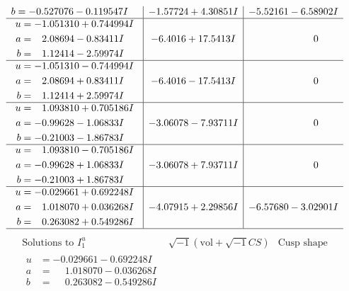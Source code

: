 \documentclass[1p]{elsarticle_modified}
\theoremstyle{definition}
\newcommand{\I}{\sqrt{-1}}
\begin{document}
$$\begin{array}{c|c|c}
\begin{aligned}
b &= -0.527076 - 0.119547 I\end{aligned}
 & -1.57724 + 4.30851 I & -5.52161 - 6.58902 I \\ \hline\begin{aligned}
u &= -1.051310 + 0.744994 I \\
a &= \phantom{-}2.08694 - 0.83411 I \\
b &= \phantom{-}1.12414 - 2.59974 I\end{aligned}
 & -6.4016 + 17.5413 I & \phantom{-0.000000 } 0 \\ \hline\begin{aligned}
u &= -1.051310 - 0.744994 I \\
a &= \phantom{-}2.08694 + 0.83411 I \\
b &= \phantom{-}1.12414 + 2.59974 I\end{aligned}
 & -6.4016 - 17.5413 I & \phantom{-0.000000 } 0 \\ \hline\begin{aligned}
u &= \phantom{-}1.093810 + 0.705186 I \\
a &= -0.99628 - 1.06833 I \\
b &= -0.21003 - 1.86783 I\end{aligned}
 & -3.06078 - 7.93711 I & \phantom{-0.000000 } 0 \\ \hline\begin{aligned}
u &= \phantom{-}1.093810 - 0.705186 I \\
a &= -0.99628 + 1.06833 I \\
b &= -0.21003 + 1.86783 I\end{aligned}
 & -3.06078 + 7.93711 I & \phantom{-0.000000 } 0 \\ \hline\begin{aligned}
u &= -0.029661 + 0.692248 I \\
a &= \phantom{-}1.018070 + 0.036268 I \\
b &= \phantom{-}0.263082 + 0.549286 I\end{aligned}
 & -4.07915 + 2.29856 I & -6.57680 - 3.02901 I\\
 \hline 
 \end{array}$$\newpage$$\begin{array}{c|c|c}  
\text{Solutions to }I^u_{1}& \I (\text{vol} + \sqrt{-1}CS) & \text{Cusp shape}\\
 \hline 
\begin{aligned}
u &= -0.029661 - 0.692248 I \\
a &= \phantom{-}1.018070 - 0.036268 I \\
b &= \phantom{-}0.263082 - 0.549286 I\end{aligned}

\end{array}$$
\end{document}
